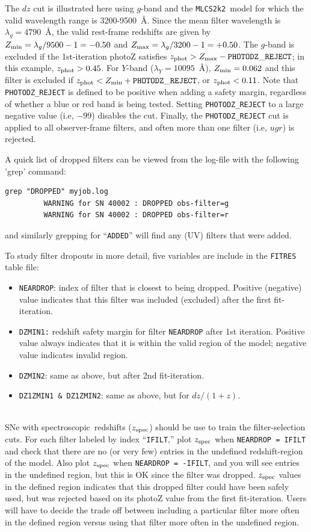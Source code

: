 \documentclass[12pt]{article}
\newcommand{\mlcs}{{\tt MLCS2k2}}
\newcommand{\Zphot}{z_{\rm phot}}
\newcommand{\Zspec}{z_{\rm spec}}
\newcommand{\spec}{spectroscopic}
\newcommand{\lamg}{\lambda_g}
\newcommand{\lamY}{\lambda_Y}
\newcommand{\zmin}{Z_{\rm min}}
\newcommand{\zmax}{Z_{\rm max}}
\begin{document}
The $dz$ cut is illustrated here using $g$-band and the \mlcs\
model for which the valid wavelength range is 3200-9500~\AA.
Since the mean filter wavelength is $\lamg = 4790$~\AA,
the valid rest-frame redshifts are given by
$\zmin = \lamg/9500 -1 = -0.50$ and
$\zmax = \lamg/3200 -1 = +0.50$.
The $g$-band is excluded if the 1st-iteration  photoZ satisfies
$\Zphot > \zmax - {\tt PHOTODZ\_REJECT}$;
in this example, $\Zphot > 0.45$.
For $Y$-band ($\lamY = 10095$~\AA), $\zmin = 0.062$
and this filter is excluded if $\Zphot < \zmin + {\tt PHOTODZ\_REJECT}$,
or $\Zphot < 0.11$.
Note that {\tt PHOTODZ\_REJECT} is defined to be positive when adding a 
safety margin, regardless of whether a blue or red band is being tested.
Setting  {\tt PHOTODZ\_REJECT} to a large negative value (i.e, $-99$)
disables the cut.
Finally, the {\tt PHOTODZ\_REJECT} cut is applied to all observer-frame
filters, and often more than one filter (i.e, $ugr$) is rejected.


A quick list of dropped filters can be viewed from the log-file
with the following 'grep' command:
\begin{Verbatim}[frame=single]
   grep "DROPPED" myjob.log
         WARNING for SN 40002 : DROPPED obs-filter=g
         WARNING for SN 40002 : DROPPED obs-filter=r
\end{Verbatim}
%
and similarly grepping for ``{\tt ADDED}'' will find any 
(UV) filters that were added.

To study filter dropouts in more detail, 
five variables are include in the {\tt FITRES} table file:
\begin{itemize}
  \item {\tt NEARDROP}: index of filter that is closest
        to being dropped. Positive (negative) value indicates
        that this filter was included (excluded) after the 
        first fit-iteration.
%
  \item {\tt DZMIN1:} redshift safety margin for filter {\tt NEARDROP}
        after 1st iteration.
        Positive value always indicates that it is within the
	valid region of the model; negative value indicates
	invalid region.
%
 \item  {\tt DZMIN2}: same as above, but after 2nd fit-iteration.
%
  \item {\tt DZ1ZMIN1 \& DZ1ZMIN2}: same as above, but for $dz/(1+z)$.
\end{itemize}

\bigskip
{} \\
SNe with \spec\ redshifts ($\Zspec$) should be use to train 
the filter-selection cuts.
For each filter labeled by index ``{\tt IFILT},''
plot $\Zspec$ when {\tt NEARDROP = IFILT} and check
that there are no (or very few) entries in the undefined
redshift-region of the model.  
Also plot $\Zspec$ when {\tt NEARDROP = -IFILT},
and you will see entries in the undefined region,
but this is OK since the filter was dropped.
$\Zspec$ values in the defined region indicates that
this dropped filter could have been safely used,
but was rejected based on its photoZ value from the
first fit-iteration. Users will have to decide the
trade off between including a particular filter more 
often in the defined region versus using that filter
more often in the undefined region.
\end{document}
